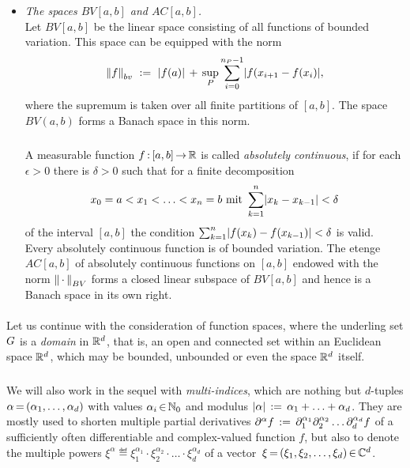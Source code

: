 \documentclass[11pt,twoside]{article}
\begin{document}
\begin{itemize}[leftmargin=12pt,itemsep=5pt]
\item[4.] \textit{The spaces $BV[a,b]$ and $AC[a,b]$.}\\
Let $BV[a,b]$ be the linear space consisting
of all functions of bounded variation.
This space can be equipped with the norm
\[
\norm{f}_{bv} \, \eqdef \,
\abs{ f(a) } \, + \,
\sup_{P} \sum_{i=0}^{n_P-1} \abs{f(x_{i+1}-f(x_i)} ,
\]
where the supremum is taken over all finite partitions of $[a,b]$.
The space $BV(a,b)$ forms a Banach space in this norm.

\subparagraph{} %
A measurable function $f{\,:\,}[a,b] {\,\to\,} {\mathbb{R}}$ is called 
\textit{absolutely continuous},
if for each $\epsilon > 0$ there is $\delta > 0$ 
such that for a finite decomposition
\[
x_0=a < x_1 < \ldots < x_n=b \mbox{ mit }
\sum_{k=1}^n \abs{x_k-x_{k-1}} < \delta
\]
of the interval $[a,b]$
the condition $\sum_{k=1}^n \abs{f(x_k)-f(x_{k-1})} < \delta$ is valid.
Every absolutely continuous function is of bounded variation.
The etenge $AC[a,b]$ of absolutely continuous functions on $[a,b]$
endowed with the norm $\left\lVert \,\cdot\, \right\rVert_{BV}$
forms a closed linear subspace of $BV[a,b]$ and hence 
is a Banach space in its own right. 
\end{itemize}

\paragraph{} %
Let us continue with the consideration of function spaces,
where the underling set $G$ is a \textit{domain} in ${\mathbb{R}}^d$,
that is,
an open and connected set within an Euclidean space ${\mathbb{R}}^d$,
which may be bounded, unbounded or even the space ${\mathbb{R}}^d$ itself.

\subparagraph{} %
We will also work in the sequel with \textit{multi-indices},
which are nothing but $d$-tuples
$\alpha {\,=\,} (\alpha_1,\ldots,\alpha_d)$
with values $\alpha_i {\,\in\,} {\mathbb{N}}_0$
and modulus $\abs{\alpha} \eqdef \alpha_1 + \ldots + \alpha_d$.
They are mostly used to shorten multiple partial derivatives
$
\partial^{\alpha} f \,:=\, \partial_1^{\alpha_1}
         \partial_2^{\alpha_2} \ldots
         \partial_d^{\alpha_d} f
$
of a sufficiently often differentiable and complex-valued function $f$,
but also to denote the multiple powers
$\xi^{\alpha} \eqdef \xi_1^{\alpha_1}
\cdot \xi_2^{\alpha_2} \cdot \ldots \cdot \xi_d^{\alpha_d}$
of a vector $\,\xi {\,=\,} (\xi_1,\xi_2,\ldots,\xi_d) {\,\in\,} {\mathbb{C}}^d$.
\end{document}
